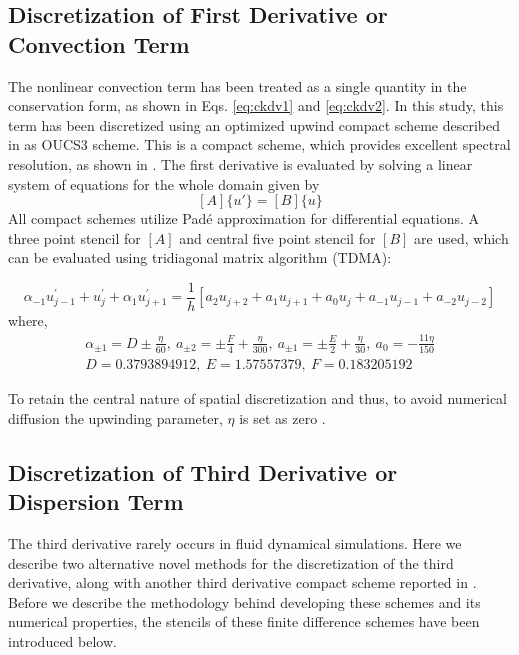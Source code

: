 \documentclass{svjour3}                    %
\begin{document}
\subsection{Discretization of First Derivative or Convection Term}
\label{subsec:OUCS3}
The nonlinear convection term has been treated as a single quantity in the conservation form, as shown in Eqs. \eqref{eq:ckdv1} and \eqref{eq:ckdv2}. 
In this study, this term has been discretized using an optimized upwind compact scheme described in \cite{Sengupta2013a} as OUCS3 scheme. This is a 
compact scheme, which provides excellent spectral resolution, as shown in \cite{Sengupta2006b}. The first derivative is evaluated by solving a linear system of equations for the whole domain given by
$$ [A]\{u'\} = [B]\{u\} $$
All compact schemes utilize Pad\'e approximation for differential equations. A three point stencil for $[A]$ and central five point stencil for $[B]$ are used, which can be evaluated using tridiagonal matrix algorithm (TDMA):

\begin{equation}
\label{eq:oucs3}
\alpha_{-1}u_{j-1}^{\prime}+u_{j}^{\prime}+\alpha_{1}u_{j+1}^{\prime}=\frac{1}{h}[a_{2}u_{j+2}+a_{1}u_{j+1}+a_{0}u_{j}+a_{-1}u_{j-1}+a_{-2}u_{j-2}]
\end{equation}
where,
\begin{align*}
\alpha_{\pm1}=D\pm\frac{\eta}{60},\
a_{\pm2}=\pm\frac{F}{4}+\frac{\eta}{300},\
a_{\pm1}=\pm\frac{E}{2}+\frac{\eta}{30},\ a_{0}=-\frac{11\eta}{150}\\
D=0.3793894912,\
E=1.57557379,\
F=0.183205192
\end{align*}

 To retain the central nature of spatial discretization and thus, to avoid numerical diffusion the upwinding parameter, $\eta$ is set as zero \cite{Sengupta2013a,Sengupta2006b}.
\subsection{Discretization of Third Derivative or Dispersion Term}
The third derivative rarely occurs in fluid dynamical simulations. Here we describe two alternative novel methods for the discretization of the third derivative, along with another third derivative compact scheme reported in \cite{Li2006}. Before we describe the methodology behind developing these schemes and its numerical properties, the stencils of these finite difference schemes have been introduced below.
\end{document}
